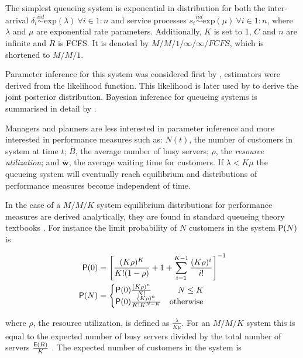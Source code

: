 \documentclass[article]{jss}
\begin{document}
The simplest queueing system is exponential in distribution for both the inter-arrival $\delta_i \overset{iid}{\sim} \mathrm{exp}(\lambda) ~ \forall i \in 1:n$ and service processes $s_i \overset{iid}{\sim} \mathrm{exp}(\mu) ~ \forall i \in 1:n$, where $\lambda$ and $\mu$ are exponential rate parameters. Additionally, $K$ is set to 1, $C$ and $n$ are infinite and $R$ is FCFS. It is denoted by $M/M/1/ \infty / \infty / FCFS$, which is shortened to $M/M/1$. 

Parameter inference for this system was considered first by \citet{clarke1957maximum}, estimators were derived from the likelihood function. This likelihood is later used by \citet{muddapur1972bayesian} to derive the joint posterior distribution. Bayesian inference for queueing systems is summarised in detail by \citet{insua2012bayesian}. 

Managers and planners are less interested in parameter inference and more interested in performance measures such as: $N(t)$, the number of customers in system at time $t$; $\bar{B}$, the average number of busy servers; $\rho$, the \textit{resource utilization}; and $\bar{\mathbf{w}}$, the average waiting time for customers. If $\lambda < K \mu$ the queueing system will eventually reach equilibrium and distributions of performance measures become independent of time. 

In the case of a $M/M/K$ system equilibrium distributions for performance measures are derived analytically, they are found in standard queueing theory textbooks \citep{lipsky2008queueing, thomopoulos2012fundamentals}. For instance the limit probability of $N$ customers in the system $\mathsf{P}(N)$  is

\begin{align}
\mathsf{P}(0) &= \left[\frac{ (K \rho)^K}{K! (1 - \rho)} + 1 + \sum_{i=1}^{K-1} \frac{(K \rho)^i}{i!}   \right]^{-1} \\
\mathsf{P}(N) &= \begin{cases} 
\mathsf{P}(0) \frac{(K \rho)^n }{N!} & \quad  N \leq K\\
\mathsf{P}(0) \frac{(K \rho)^n }{K! K^{N-K}} & \text{otherwise}
\end{cases} \label{eq:pn}
\end{align}

where $\rho$, the resource utilization, is defined as $\frac{\lambda}{K \mu}$. For an $M/M/K$ system this is equal to the expected number of busy servers divided by the total number of servers $\frac{\mathsf{E}(B)}{K}$ \citep[pg. 451]{cassandras2009introduction}. The expected number of customers in the system is \citep{bhat2015introduction}  
\end{document}
